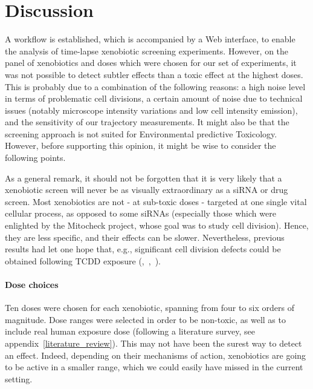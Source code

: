 \section{Discussion}

A workflow is established, which is accompanied by a Web interface, to enable the analysis of time-lapse xenobiotic screening experiments. However, on the panel of xenobiotics and doses which were chosen for our set of experiments, it was not possible to detect subtler effects than a toxic effect at the highest doses. This is probably due to a combination of the following reasons: a high noise level in terms of problematic cell divisions, a certain amount of noise due to technical issues (notably microscope intensity variations and low cell intensity emission), and the sensitivity of our trajectory measurements. It might also be that the screening approach is not suited for Environmental predictive Toxicology. However, before supporting this opinion, it might be wise to consider the following points.

As a general remark, it should not be forgotten that it is very likely that a xenobiotic screen will never be as visually extraordinary as a siRNA or drug screen. Most xenobiotics are not - at sub-toxic doses - targeted at one single vital cellular process, as opposed to some siRNAs (especially those which were enlighted by the Mitocheck project, whose goal was to study cell division). Hence, they are less specific, and their effects can be slower. Nevertheless, previous results had let one hope that, e.g., significant cell division defects could be obtained following TCDD exposure (\cite{pmid20089886},~\cite{pmid18640100},~\cite{pmid11479202}).

\paragraph{Dose choices\\}
Ten doses were chosen for each xenobiotic, spanning from four to six orders of magnitude. Dose ranges were selected in order to be non-toxic, as well as to include real human exposure dose (following a literature survey, see appendix~\ref{literature_review}). This may not have been the surest way to detect an effect. Indeed, depending on their mechanisms of action, xenobiotics are going to be active in a smaller range, which we could easily have missed in the current setting.

